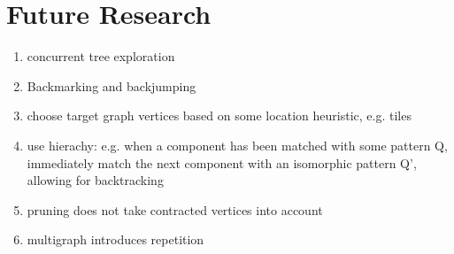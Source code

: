 \chapter{Future Research}

\begin{enumerate}
\item concurrent tree exploration
\item Backmarking and backjumping
\item choose target graph vertices based on some location heuristic, e.g. tiles
\item use hierachy: e.g. when a component has been matched with some pattern Q, immediately match the next component with an isomorphic pattern Q', allowing for backtracking
\item pruning does not take contracted vertices into account
\item multigraph introduces repetition
\end{enumerate}
